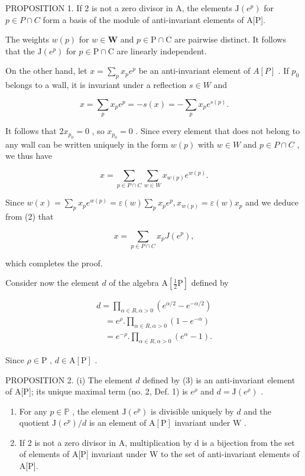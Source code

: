 PROPOSITION 1. If 2 is not a zero divisor in A, the elements \(\mathrm{J}(e^{p})\) for \(p \in P \cap C\) form a basis of the module of anti-invariant elements of A{[}P{]}.

The weights \(w(p)\) for \(w \in \mathbf{W}\) and \(p \in \mathrm{P} \cap \mathrm{C}\) are pairwise distinct. It follows that the \(\mathrm{J}(e^p)\) for \(p \in \mathrm{P} \cap \mathrm{C}\) are linearly independent.

On the other hand, let \(x = \sum_{p} x_{p} e^{p}\) be an anti-invariant element of \(A[P]\) . If \(p_{0}\) belongs to a wall, it is invariant under a reflection \(s \in W\) and

\[
x = \sum_ {p} x _ {p} e ^ {p} = - s (x) = - \sum_ {p} x _ {p} e ^ {s (p)}.
\]

It follows that \(2x_{p_{0}} = 0\) , so \(x_{p_{0}} = 0\) . Since every element that does not belong to any wall can be written uniquely in the form \(w(p)\) with \(w \in W\) and \(p \in P \cap C\) , we thus have

\[
x = \sum_ {p \in P \cap C} \sum_ {w \in W} x _ {w (p)} e ^ {w (p)}.\tag{2}
\]

Since \(w(x) = \sum_{p} x_{p} e^{w(p)} = \varepsilon(w) \sum_{p} x_{p} e^{p}, x_{w(p)} = \varepsilon(w) x_{p}\) and we deduce from (2) that

\[
x = \sum_ {p \in P \cap C} x _ {p} J (e ^ {p}),
\]

which completes the proof.

Consider now the element \(d\) of the algebra \(\mathrm{A}[\frac{1}{2}\mathrm{P}]\) defined by

\[
\begin{array}{l} d = \prod_ {\alpha \in R, \alpha > 0} (e ^ {\alpha / 2} - e ^ {- \alpha / 2}) \\ \quad = e ^ {\rho}. \prod_ {\alpha \in R, \alpha > 0} (1 - e ^ {- \alpha}) \\ \quad = e ^ {- \rho}. \prod_ {\alpha \in R, \alpha > 0} (e ^ {\alpha} - 1). \end{array}\tag{3}
\]

Since \(\rho \in \mathrm{P}\) , \(d \in \mathrm{A}[\mathrm{P}]\) .

PROPOSITION 2. (i) The element \(d\) defined by (3) is an anti-invariant element of A{[}P{]}; its unique maximal term (no. 2, Def. 1) is \(e^{\rho}\) and \(d = \mathrm{J}(e^{\rho})\) .

\begin{enumerate}
\def\labelenumi{(\roman{enumi})}
\setcounter{enumi}{1}
\item
  For any \(p \in \mathbb{P}\) , the element \(\mathrm{J}(e^p)\) is divisible uniquely by \(d\) and the quotient \(\mathrm{J}(e^p)/d\) is an element of \(\mathrm{A}[\mathrm{P}]\) invariant under \(\mathrm{W}\) .
\item
  If 2 is not a zero divisor in A, multiplication by d is a bijection from the set of elements of A{[}P{]} invariant under W to the set of anti-invariant elements of A{[}P{]}.
\end{enumerate}

